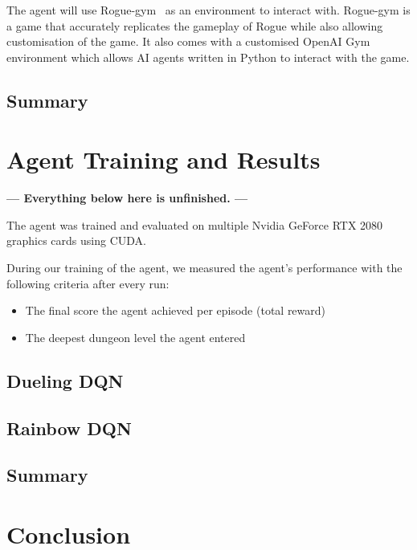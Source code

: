 \documentclass[12pt,a4paper]{article}
\begin{document}
    The agent will use Rogue-gym~\citep{kanagawa19} as an environment to interact with.
    Rogue-gym is a game that accurately replicates the gameplay of Rogue while also allowing customisation of the game.
    It also comes with a customised OpenAI Gym environment which allows AI agents written in Python to interact with the game.

    \subsection{Summary}\label{subsec:summary2} %

    \section{Agent Training and Results}\label{sec:agent-training-and-results}  %
    \textbf{--- Everything below here is unfinished. ---}

    The agent was trained and evaluated on multiple Nvidia GeForce RTX 2080 graphics cards using CUDA.

    During our training of the agent, we measured the agent's performance with the following criteria after every run:
    \begin{itemize}
        \item The final score the agent achieved per episode (total reward)
        \item The deepest dungeon level the agent entered
    \end{itemize}

    \subsection{Dueling DQN}\label{subsec:dueling-dqn}

    \subsection{Rainbow DQN}\label{subsec:rainbow-dqn}

    \subsection{Summary}\label{subsec:summary}

    \section{Conclusion}\label{sec:conclusion}
\end{document}

